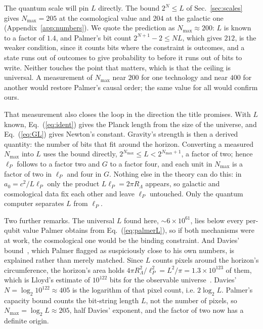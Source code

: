 \documentclass[aps,prd,twocolumn,superscriptaddress,nofootinbib,showkeys]{revtex4-2}
\begin{document}
The quantum scale will pin $L$ directly. The bound $2^N\le L$ of Sec.~\ref{sec:scales} gives $N_{\max}=205$ at the cosmological value and $204$ at the galactic one (Appendix~\ref{app:numbers}). We quote the prediction as $N_{\max}\approx200$: $L$ is known to a factor of $1.4$, and Palmer's bit count $2^{N+1}-2\le NL$, which gives $212$, is the weaker condition, since it counts bits where the constraint is outcomes, and a state runs out of outcomes to give probability to before it runs out of bits to write. Neither touches the point that matters, which is that the ceiling is universal. A measurement of $N_{\max}$ near $200$ for one technology and near $400$ for another would restore Palmer's causal order; the same value for all would confirm ours.

That measurement also closes the loop in the direction the title promises. With $L$ known, Eq.~(\ref{eq:ident}) gives the Planck length from the size of the universe, and Eq.~(\ref{eq:GL}) gives Newton's constant. Gravity's strength is then a derived quantity: the number of bits that fit around the horizon. Converting a measured $N_{\max}$ into $L$ uses the bound directly, $2^{N_{\max}}\le L<2^{N_{\max}+1}$, a factor of two; hence $\ell_P$ follows to a factor two and $G$ to a factor four, and each unit in $N_{\max}$ is a factor of two in $\ell_P$ and four in $G$. Nothing else in the theory can do this: in $a_0 = c^2/L\ell_P$ only the product $L\ell_P = 2\pi R_\Lambda$ appears, so galactic and cosmological data fix each other and leave $\ell_P$ untouched. Only the quantum computer separates $L$ from $\ell_P$.

Two further remarks. The universal $L$ found here, $\sim6\times10^{61}$, lies below every per-qubit value Palmer obtains from Eq.~(\ref{eq:palmerL}), so if both mechanisms were at work, the cosmological one would be the binding constraint. And Davies' bound~\cite{davies2007}, which Palmer flagged as suspiciously close to his own numbers, is explained rather than merely matched. Since $L$ counts pixels around the horizon's circumference, the horizon's area holds $4\pi R_\Lambda^2/\ell_P^2 = L^2/\pi = 1.3\times10^{123}$ of them, which is Lloyd's estimate of $10^{122}$ bits for the observable universe~\cite{lloyd2002}. Davies' $N = \log_2 10^{122}\approx405$ is the logarithm of that pixel count, i.e. $2\log_2L$. Palmer's capacity bound counts the bit-string length $L$, not the number of pixels, so $N_{\max} = \log_2 L\approx205$, half Davies' exponent, and the factor of two now has a definite origin.
\end{document}
